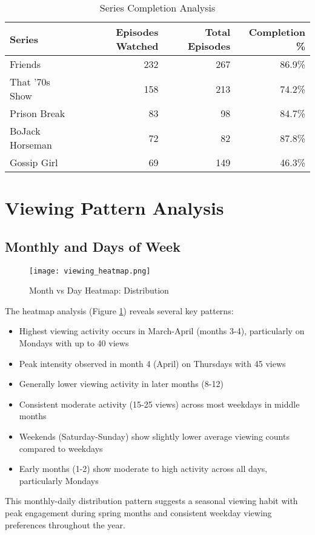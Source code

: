 \documentclass[12pt]{article}
\begin{document}
\begin{table}[H]
\centering
\caption{Series Completion Analysis}
\label{tab:completion}
\begin{tabular}{lrrr}
\toprule
Series & Episodes Watched & Total Episodes & Completion \% \\
\midrule
Friends & 232 & 267 & 86.9\% \\
That '70s Show & 158 & 213 & 74.2\% \\
Prison Break & 83 & 98 & 84.7\% \\
BoJack Horseman & 72 & 82 & 87.8\% \\
Gossip Girl & 69 & 149 & 46.3\% \\
\bottomrule
\end{tabular}
\end{table}

\section{Viewing Pattern Analysis}
\subsection{Monthly and Days of Week}
\begin{figure}[H]
\centering
\texttt{[image: viewing\_heatmap.png]}
\caption{Month vs Day Heatmap: Distribution}
\label{fig:heatmap}
\end{figure}

The heatmap analysis (Figure \ref{fig:heatmap}) reveals several key patterns:
\begin{itemize}
    \item Highest viewing activity occurs in March-April (months 3-4), particularly on Mondays with up to 40 views
    \item Peak intensity observed in month 4 (April) on Thursdays with 45 views
    \item Generally lower viewing activity in later months (8-12)
    \item Consistent moderate activity (15-25 views) across most weekdays in middle months
    \item Weekends (Saturday-Sunday) show slightly lower average viewing counts compared to weekdays
    \item Early months (1-2) show moderate to high activity across all days, particularly Mondays
\end{itemize}

This monthly-daily distribution pattern suggests a seasonal viewing habit with peak engagement during spring months and consistent weekday viewing preferences throughout the year.
\end{document}
